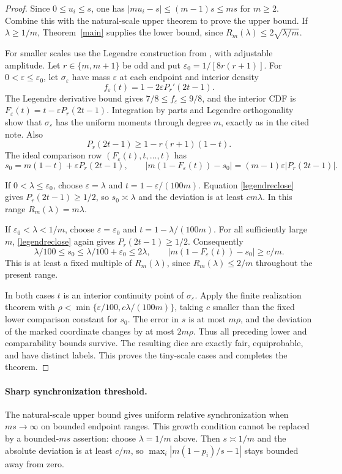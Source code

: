 \documentclass[11pt]{article}
\begin{document}
\begin{proof}
Since $0\le u_i\le s$, one has
$|m u_i-s|\le(m-1)s\le ms$ for $m\ge2$.
Combine this with the natural-scale upper theorem to prove the upper
bound. If $\lambda\ge1/m$, Theorem~\ref{main} supplies the lower
bound, since $R_m(\lambda)\le2\sqrt{\lambda/m}$.

For smaller scales use the Legendre construction from
, with adjustable amplitude.
Let $r\in\{m,m+1\}$ be odd and put
$\varepsilon_0=1/[8r(r+1)]$.
For $0<\varepsilon\le\varepsilon_0$, let $\sigma_\varepsilon$
have mass $\varepsilon$ at each endpoint and interior density
\[
 f_\varepsilon(t)=1-2\varepsilon P_r'(2t-1).
\]
The Legendre derivative bound gives $7/8\le f_\varepsilon\le9/8$,
and the interior CDF is
$F_\varepsilon(t)=t-\varepsilon P_r(2t-1)$.
Integration by parts and Legendre orthogonality show that
$\sigma_\varepsilon$ has the uniform moments through degree $m$,
exactly as in the cited note. Also
\begin{equation}\label{legendreclose}
 P_r(2t-1)\ge1-r(r+1)(1-t).
\end{equation}
The ideal comparison row $(F_\varepsilon(t),t,\ldots,t)$ has
\[
 s_0=m(1-t)+\varepsilon P_r(2t-1),\qquad
 |m(1-F_\varepsilon(t))-s_0|
       =(m-1)\varepsilon|P_r(2t-1)|.
\]

If $0<\lambda\le\varepsilon_0$, choose $\varepsilon=\lambda$
and $t=1-\varepsilon/(100m)$.
Equation \eqref{legendreclose} gives $P_r(2t-1)\ge1/2$, so
$s_0\asymp\lambda$ and the deviation is at least $cm\lambda$.
In this range $R_m(\lambda)=m\lambda$.

If $\varepsilon_0<\lambda<1/m$, choose
$\varepsilon=\varepsilon_0$ and $t=1-\lambda/(100m)$.
For all sufficiently large $m$, \eqref{legendreclose} again gives
$P_r(2t-1)\ge1/2$. Consequently
\[
 \lambda/100\le s_0\le\lambda/100+\varepsilon_0\le2\lambda,
 \qquad |m(1-F_\varepsilon(t))-s_0|\ge c/m.
\]
This is at least a fixed multiple of $R_m(\lambda)$, since
$R_m(\lambda)\le2/m$ throughout the present range.

In both cases $t$ is an interior continuity point of
$\sigma_\varepsilon$. Apply the finite realization theorem with
$\rho<\min\{\varepsilon/100,c\lambda/(100m)\}$, taking $c$
smaller than the fixed lower comparison constant for $s_0$.
The error in $s$ is at most $m\rho$, and the deviation of the
marked coordinate changes by at most $2m\rho$. Thus all preceding
lower and comparability bounds survive. The resulting dice are
exactly fair, equiprobable, and have distinct labels. This proves
the tiny-scale cases and completes the theorem.
\end{proof}
\paragraph{Sharp synchronization threshold.}
The natural-scale upper bound gives uniform relative synchronization
when $ms\to\infty$ on bounded endpoint ranges. This growth condition
cannot be replaced by a bounded-$ms$ assertion: choose
$\lambda=1/m$ above. Then $s\asymp1/m$ and the absolute deviation is
at least $c/m$, so $\max_i|m(1-p_i)/s-1|$ stays bounded away from zero.
\end{document}
